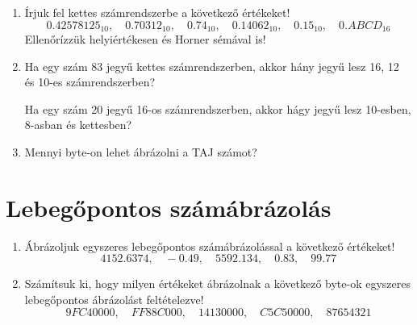 \documentclass[a4paper]{article}
\begin{document}
\begin{enumerate}
Váltsuk át a 32412 és -1111 számokat kettes számrendszerbe!
\begin{itemize}
	\item Mennyi bitből fog állni?
	\item Adjuk össze őket kettes számrendszerben!
	\item Az összeget számoljuk vissza 10-es számrendszerbe, és ellenőrízzük!
\end{itemize}

\item

Írjuk fel kettes számrendszerbe a következő értékeket!
$$
0.42578125_{10}, \quad
0.70312_{10}, \quad
0.74_{10}, \quad
0.14062_{10}, \quad
0.15_{10}, \quad
0.ABCD_{16}
$$
Ellenőrízzük helyiértékesen és Horner sémával is!

\item

Ha egy szám 83 jegyű kettes számrendszerben, akkor hány jegyű lesz 16, 12 és 10-es számrendszerben?

\medskip

Ha egy szám 20 jegyű 16-os számrendszerben, akkor hágy jegyű lesz 10-esben, 8-asban és kettesben?

\item

Mennyi byte-on lehet ábrázolni a TAJ számot?

\end{enumerate}

\section*{Lebegőpontos számábrázolás}

\begin{enumerate}

\item

Ábrázoljuk egyszeres lebegőpontos számábrázolással a következő értékeket!
$$
4152.6374, \quad
-0.49, \quad
5592.134, \quad
0.83, \quad
99.77
$$

\item

Számítsuk ki, hogy milyen értékeket ábrázolnak a következő byte-ok egyszeres lebegőpontos ábrázolást feltételezve!
$$
9FC40000, \quad FF88C000, \quad 14130000, \quad C5C50000, \quad 87654321
$$

\end{enumerate}

\end{document}
